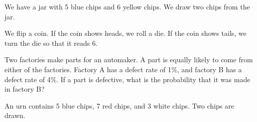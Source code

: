 \documentclass[12pt]{exam}
\begin{document}
\begin{questions}
\question
We have a jar with 5 blue chips and 6 yellow chips.  We draw two chips from the jar.  

\question
We flip a coin.  If the coin shows heads, we roll a die.  If the coin shows tails, we turn the die so that it reads 6.

\question Two factories make parts for an automaker.  A part is equally likely to come from either of the factories.  Factory A has a defect rate of 1\%, and factory B has a defect rate of 4\%. If a part is defective, what is the probability that it was made in factory B?

\question
An urn contains 5 blue chips, 7 red chips, and 3 white chips.  Two chips are drawn.


\end{questions}
\end{document}

